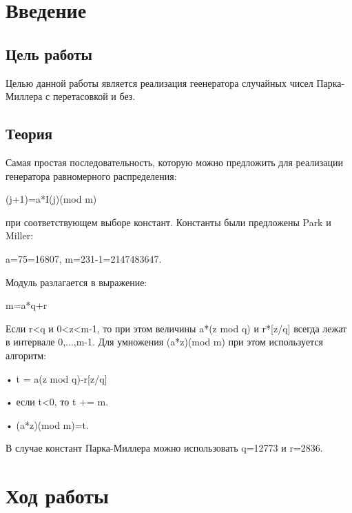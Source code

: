 \documentclass[12pt,a4paper]{scrartcl}
\begin{document}
\section{Введение}
\label{sec:intro}


\subsection{Цель работы}
Целью данной работы является реализация геенератора случайных чисел Парка-Миллера с перетасовкой и без. 

\subsection{Теория}
Самая простая последовательность, которую можно предложить для реализации генератора равномерного распределения:

{\centering(j+1)=a*I(j)(mod m)

}
при соответствующем выборе констант. Константы были предложены Park и Miller:

{\centering a=75=16807, m=231-1=2147483647.

}
Модуль разлагается в выражение:

{\centering m=a*q+r

}
Если r<q и 0<z<m-1, то при этом величины a*(z mod q) и r*[z/q] всегда лежат в интервале 0,...,m-1. Для умножения (a*z)(mod m) при этом используется алгоритм:

    • t = a(z mod q)-r[z/q]

    • если t<0, то t += m.

    • (a*z)(mod m)=t.

В случае констант Парка-Миллера можно использовать q=12773 и r=2836.
\section{Ход работы}
\end{document}
